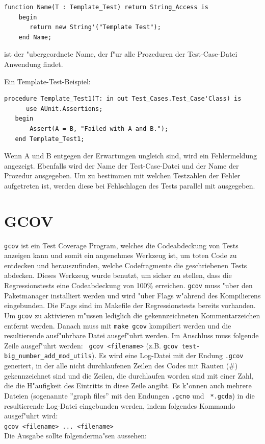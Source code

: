 \begin{lstlisting}
function Name(T : Template_Test) return String_Access is
	begin
	   return new String'("Template Test");
	end Name;
\end{lstlisting}

ist der "ubergeordnete Name, der f"ur alle Prozeduren der
Test-Case-Datei Anwendung findet.

Ein Template-Test-Beispiel:
\begin{lstlisting}
procedure Template_Test1(T: in out Test_Cases.Test_Case'Class) is
      use AUnit.Assertions; 
   begin      
       Assert(A = B, "Failed with A and B.");
   end Template_Test1;
\end{lstlisting}

Wenn A und B entgegen der Erwartungen ungleich sind, wird ein
Fehlermeldung angezeigt. Ebenfalls wird der Name der Test-Case-Datei
und der Name der Prozedur ausgegeben.  Um zu bestimmen mit welchen
Testzahlen der Fehler aufgetreten ist, werden diese bei Fehlschlagen
des Tests parallel mit ausgegeben.

\section{GCOV}
{\tt gcov} ist ein Test Coverage Program, welches die Codeabdeckung
von Tests anzeigen kann und somit ein angenehmes Werkzeug ist, um
toten Code zu entdecken und herauszufinden, welche Codefragmente die
geschriebenen Tests abdecken.  Dieses Werkzeug wurde benutzt, um
sicher zu stellen, dass die Regressionstests eine Codeabdeckung von
100\% erreichen.  {\tt gcov} muss "uber den Paketmanager installiert
werden und wird "uber Flags w"ahrend des Kompilierens eingebunden.
Die Flags sind im Makefile der Regressionstests bereits vorhanden. Um
{\tt gcov} zu aktivieren m"ussen lediglich die gekennzeichneten
Kommentarzeichen entfernt werden.  Danach muss mit {\tt make gcov}
kompiliert werden und die resultierende ausf"uhrbare Datei ausgef"uhrt
werden.  Im Anschluss muss folgende Zeile ausgef"uhrt werden: {\tt
  gcov <filename>} (z.B. {\tt gcov
  test-big\_number\_add\_mod\_utils}).  Es wird eine Log-Datei mit der
Endung {\tt .gcov} generiert, in der alle nicht durchlaufenen Zeilen
des Codes mit Rauten (\#) gekennzeichnet sind und die Zeilen, die
durchlaufen worden sind mit einer Zahl, die die H"aufigkeit des
Eintritts in diese Zeile angibt.  Es k"onnen auch mehrere Dateien
(sogenannte ''graph files'' mit den Endungen {\tt *.gcno} und {\tt
  *.gcda}) in die resultierende Log-Datei eingebunden werden, indem
folgendes Kommando ausgef"uhrt wird:\\ {\tt gcov <filename>
  ... <filename>}\\ Die Ausgabe sollte folgenderma"sen aussehen:

